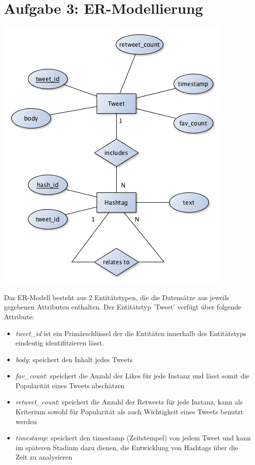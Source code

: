 \documentclass[12pt]{article}
\begin{document}
\section*{Aufgabe 3: ER-Modellierung}
\centerline{\includegraphics[scale=0.6]{img/img3.png} }
Das ER-Modell besteht aus 2 Entitätstypen, die die Datensätze aus jeweils gegebenen Attributen enthalten.
Der Entitätstyp 'Tweet' verfügt über folgende Attribute:
\begin{itemize}
\item \textit{tweet\_id}  ist ein Primärschlüssel der die Entitäten innerhalb des Entitätstyps eindeutig identifitzieren lässt.
\item \textit{body}: speichert den Inhalt jedes Tweets
\item \textit{fav\_count}: speichert die Anzahl der Likes für jede Instanz und lässt somit die Popularität eines Tweets abschätzen
\item \textit{retweet\_count}: speichert die Anzahl der Retweets für jede Instanz, kann als Kriterium sowohl für Popularität als auch  Wichtigkeit eines Tweets benutzt werden
\item \textit{timestamp}: speichert den timestamp (Zeitstempel) von jedem Tweet und kann im späteren Stadium dazu dienen, die Entwicklung von Hashtags über die Zeit zu analysieren
\end{itemize}
\end{document}

